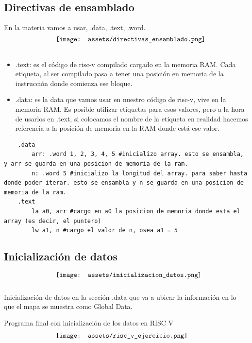 \documentclass[10pt,a4paper]{article}
\begin{document}
\subsection*{Directivas de ensamblado}
En la materia vamos a usar, .data, .text, .word. 
\[\begin{minipage}[b]{0.6\textwidth}
    \texttt{[image: assets/directivas\_ensamblado.png]}
    \label{fig:directivas_ensamblado}
\end{minipage}\]
\begin{itemize}
    \item .text: es el código de risc-v compilado cargado en la memoria RAM. Cada etiqueta, al ser compilado pasa a tener una posición en memoria de la instrucción donde comienza ese bloque.
    \item .data: es la data que vamos usar en nuestro código de risc-v, vive en la memoria RAM. Es posible utilizar etiquetas para esos valores, pero a la hora de usarlos en .text, si colocamos el nombre de la etiqueta en realidad hacemos referencia a la posición de memoria en la RAM donde está ese valor.
\end{itemize}
\begin{lstlisting}
    .data
        arr: .word 1, 2, 3, 4, 5 #inicializo array. esto se ensambla, y arr se guarda en una posicion de memoria de la ram.
        n: .word 5 #inicializo la longitud del array. para saber hasta donde poder iterar. esto se ensambla y n se guarda en una posicion de memoria de la ram.
    .text
        la a0, arr #cargo en a0 la posicion de memoria donde esta el array (es decir, el puntero)
        lw a1, n #cargo el valor de n, osea a1 = 5
\end{lstlisting}
\subsection*{Inicialización de datos}
\[\begin{minipage}[b]{0.6\textwidth}
    \texttt{[image: assets/inicializacion\_datos.png]}
    \label{fig:inicializacion_datos}
\end{minipage}\]
Inicialización de datos en la sección .data que va a ubicar la información en lo que el mapa se muestra como Global Data.

Programa final con inicialización de los datos en RISC V
\[\begin{minipage}[b]{0.6\textwidth}
    \texttt{[image: assets/risc\_v\_ejercicio.png]}
    \label{fig:risc_v_ejercicio}
\end{minipage}\]
\end{document}

